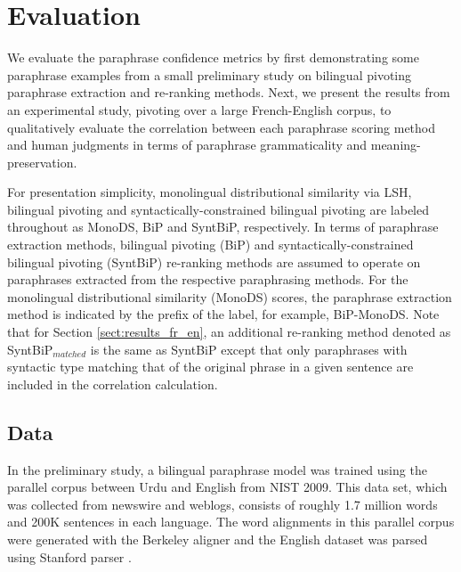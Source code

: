 \documentclass[11pt]{article}
\begin{document}
\section{Evaluation}
We evaluate the paraphrase confidence metrics by first demonstrating some paraphrase examples from a small preliminary study on bilingual pivoting paraphrase extraction and re-ranking methods. Next, we present the results from an experimental study, pivoting over a large French-English corpus, to qualitatively evaluate the correlation between each paraphrase scoring method and human judgments in terms of paraphrase grammaticality and meaning-preservation. %

For presentation simplicity, monolingual distributional similarity via LSH, bilingual pivoting and syntactically-constrained bilingual pivoting are labeled throughout as MonoDS, BiP and SyntBiP, respectively. In terms of paraphrase extraction methods, bilingual pivoting (BiP) and syntactically-constrained bilingual pivoting (SyntBiP) re-ranking methods are assumed to operate on paraphrases extracted from the respective paraphrasing methods. For the monolingual distributional similarity (MonoDS) scores, the paraphrase extraction method is indicated by the prefix of the label, for example, BiP-MonoDS. Note that for Section \ref{sect:results_fr_en}, an additional re-ranking method denoted as SyntBiP$_{matched}$ is the same as SyntBiP except that only paraphrases with syntactic type matching that of the original phrase in a given sentence are included in the correlation calculation.

\subsection{Data}

In the preliminary study, a bilingual paraphrase model was trained using the parallel corpus between Urdu and English from NIST 2009. This data set, which was collected from newswire and weblogs, consists of roughly 1.7 million words and 200K sentences in each language. The word alignments in this parallel corpus were generated with the Berkeley aligner and the English dataset was parsed using Stanford parser \cite{KleinManning03}. %
\end{document}
